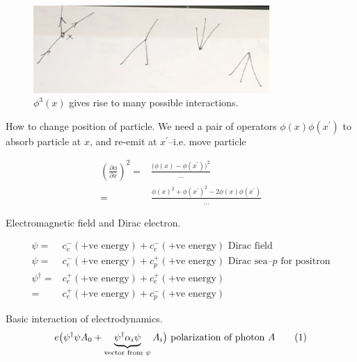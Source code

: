 \documentclass[]{article}
\newcommand\numberthis{\addtocounter{equation}{1}\tag{\theequation}}
\begin{document}
\begin{figure}[H]
	\caption{$\phi^3(x)$ gives rise to many possible interactions.}\label{fig:phi:3:x}
	\includegraphics[width=0.8\textwidth]{phi-3-x}
\end{figure}

How to change position of particle. We need a pair of operators $\phi(x) \phi(x^\prime)$ to absorb particle at $x$, and re-emit at $x^\prime$--i.e. move particle

\begin{align*}
(\frac{\partial \phi}{\partial x})^2 =& \frac{\big( \phi(x) - \phi(x^\prime)\big)^2}{...}\\
=& \frac{\phi(x)^2 + \phi(x^\prime)^2 - 2  \phi(x) \phi(x^\prime)}{...}
\end{align*}

Electromagnetic field and Dirac electron.

\begin{align*}
	\psi =& c_e^-(\text{+ve energy}) + c_e^-(\text{+ve energy}) \text{ Dirac field}\\
	\psi =& c_e^-(\text{+ve energy}) + c_p^+(\text{+ve energy}) \text { Dirac sea--$p$ for positron}\\
	\psi^\dagger =& c_e^+(\text{+ve energy}) + c_e^+(\text{+ve energy})\\
	=& c_e^+(\text{+ve energy}) + c_p^-(\text{+ve energy})
\end{align*}

Basic interaction of electrodynamics.
\begin{align*}
	e \big( \psi^\dagger \psi A_0 + 	\underbrace{\psi^\dagger \alpha_i  \psi}_\text{vector from $\psi$} A_i \big) \text{ polarization of photon $A$} \numberthis \label{eq:basic:interaction}
\end{align*}
\end{document}
